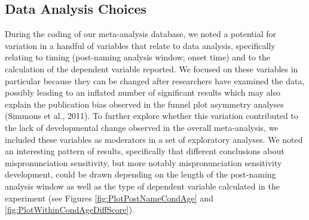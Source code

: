 \documentclass[man]{apa6}
\begin{document}
\hypertarget{data-analysis-choices}{%
\subsection{Data Analysis Choices}\label{data-analysis-choices}}

During the coding of our meta-analysis database, we noted a potential for variation in a handful of variables that relate to data analysis, specifically relating to timing (post-naming analysis window; onset time) and to the calculation of the dependent variable reported. We focused on these variables in particular because they can be changed after researchers have examined the data, possibly leading to an inflated number of significant results which may also explain the publication bias observed in the funnel plot asymmetry analyses (Simmons et al., 2011). To further explore whether this variation contributed to the lack of developmental change observed in the overall meta-analysis, we included these variables as moderators in a set of exploratory analyses. We noted an interesting pattern of results, specifically that different conclusions about mispronunciation sensitivity, but more notably mispronunciation sensitivity development, could be drawn depending on the length of the post-naming analysis window as well as the type of dependent variable calculated in the experiment (see Figures \ref{fig:PlotPostNameCondAge} and \ref{fig:PlotWithinCondAgeDiffScore}).
\end{document}
